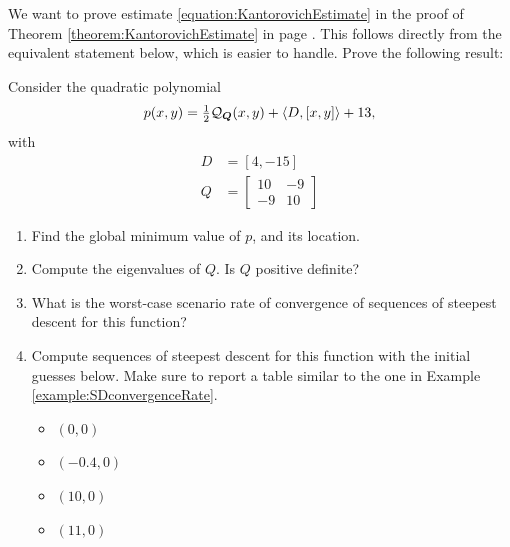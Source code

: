 \begin{problem}[Advanced]
We want to prove estimate \eqref{equation:KantorovichEstimate} in the proof of Theorem \ref{theorem:KantorovichEstimate} in page \pageref{equation:KantorovichEstimate}.  This follows directly from the equivalent statement below, which is easier to handle.  Prove the following result:
\begin{center}
\end{center}
\end{problem}

\begin{problem}
Consider the quadratic polynomial 
\begin{equation*}
p(x,y) = \tfrac{1}{2} \mathcal{Q}_{\boldsymbol{Q}}(x,y) + \langle D, [x,y] \rangle + 13,
\end{equation*}
with
\begin{align*}
D &= [4, -15] \\
Q &= \begin{bmatrix} 10 & -9 \\ -9 & 10 \end{bmatrix}
\end{align*}
\begin{enumerate}
	\item Find the global minimum value of $p$, and its location.
	\item Compute the eigenvalues of $Q$.  Is $Q$ positive definite?
	\item What is the worst-case scenario rate of convergence of sequences of steepest descent for this function?
	\item Compute sequences of steepest descent for this function with the initial guesses below.  Make sure to report a table similar to the one in Example \ref{example:SDconvergenceRate}.
	\begin{itemize}
		\item $(0,0)$
		\item $(-0.4, 0)$
		\item $(10,0)$
		\item $(11, 0)$
	\end{itemize}
\end{enumerate}
\end{problem}

